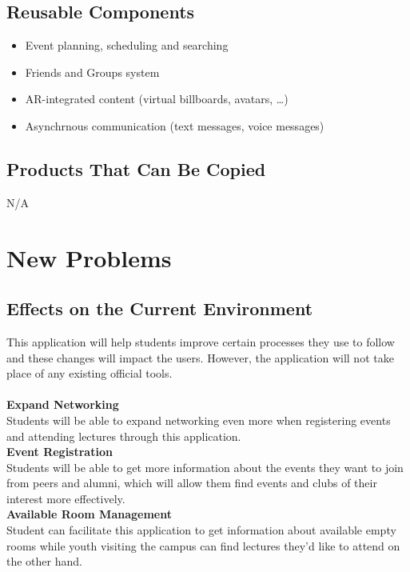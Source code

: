 \documentclass[12pt]{article}
\begin{document}
\subsection{Reusable Components}
\begin{itemize}
  \item Event planning, scheduling and searching
  \item Friends and Groups system
  \item AR-integrated content (virtual billboards, avatars, \dots)
  \item Asynchrnous communication (text messages, voice messages)
\end{itemize}
\subsection{Products That Can Be Copied}
N/A
\section{New Problems}
\subsection{Effects on the Current Environment}

This application will help students improve certain processes they use to follow and these changes will impact the users. However, the application will not take place of any existing official tools.\\
\noindent\\
\textbf{Expand Networking}\\
Students will be able to expand networking even more when registering events and attending lectures through this application.
\noindent\\
\textbf{Event Registration}\\
Students will be able to get more information about the events they want to join from peers and alumni, which will allow them find events and clubs of their interest more effectively.
\noindent\\
\textbf{Available Room Management}\\
Student can facilitate this application to get information about available empty rooms while youth visiting the campus can find lectures they'd like to attend on the other hand. 
\end{document}
